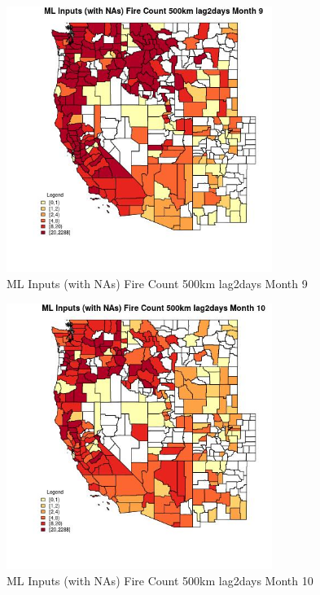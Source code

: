 \clearpage 

\begin{figure} 
\centering  
\includegraphics[width=0.77\textwidth]{Code_Outputs/Report_ML_input_PM25_Step4_part_e_de_duplicated_aves_compiled_2019-05-20wNAs_CountyFire_Count_500km_lag2daysmedianMonth9.jpg} 
\caption{\label{fig:Report_ML_input_PM25_Step4_part_e_de_duplicated_aves_compiled_2019-05-20wNAsCountyFire_Count_500km_lag2daysmedianMonth9}ML Inputs (with NAs) Fire Count 500km lag2days Month 9} 
\end{figure} 
 

\begin{figure} 
\centering  
\includegraphics[width=0.77\textwidth]{Code_Outputs/Report_ML_input_PM25_Step4_part_e_de_duplicated_aves_compiled_2019-05-20wNAs_CountyFire_Count_500km_lag2daysmedianMonth10.jpg} 
\caption{\label{fig:Report_ML_input_PM25_Step4_part_e_de_duplicated_aves_compiled_2019-05-20wNAsCountyFire_Count_500km_lag2daysmedianMonth10}ML Inputs (with NAs) Fire Count 500km lag2days Month 10} 
\end{figure} 
 

